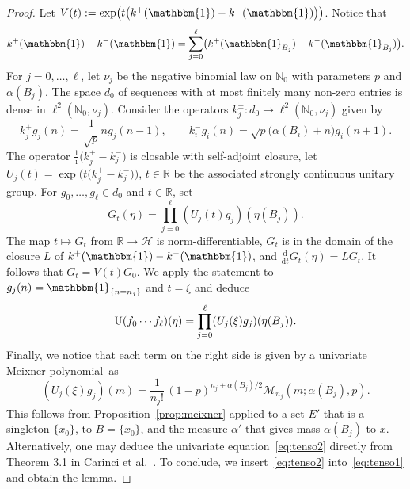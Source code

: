 \documentclass[pdftex]{sigma}
\numberwithin{equation}{section}
\newcommand{\N}{\mathbb{N}}
\newcommand{\R}{\mathbb{R}}
\newcommand{\dd}{\mathrm{d}} %
\newcommand{\1}{\mathbbm{1}}
\begin{document}
\begin{proof}
	Let $V(t):= \exp\bigl( t \bigl(k^+(\1) - k^-(\1)\bigr)\bigr)$. Notice that
	\[
		k^+(\1) - k^-(\1) = \sum_{j=0}^\ell \bigl( k^+(\1_{B_j}) - k^-(\1_{B_j})\bigr).
	\]
	For $j=0,\ldots,\ell$, let $\nu_j$ be the negative binomial law on $\N_0$ with parameters $p$ and $\alpha(B_j)$. The space $d_0$ of sequences with at most finitely many non-zero entries is dense in $\ell^2(\N_0,\nu_j)$. Consider the operators $k_j^\pm\colon d_0\to \ell^2(\N_0,\nu_j)$ given by
	\[
		k_j^+ g_j(n) = \frac{1}{\sqrt p} n g_{j}(n -1),\qquad k_i^- g_i(n) = \sqrt{p} \bigl(\alpha(B_{i})+n\bigr) g_i(n+1).
	\]
	The operator $\frac{ 1} {\mathrm i} \bigl(k_j^+- k_j^-\bigr)$ is closable with self-adjoint closure, let $U_j(t) = \exp\bigl( t \bigl(k_j^+-k_j^-\bigr)\bigr)$, $t\in \R$ be the associated strongly continuous unitary group.
	For $g_0,\ldots, g_\ell \in d_0$ and $t\in \R$, set
	\[
		G_t(\eta) = \prod_{j=0}^\ell ( U_j(t) g_j)( \eta(B_j)).
	\]
	The map $t\mapsto G_t$ from $\R\to \mathcal H$ is norm-differentiable, $G_t$ is in the domain of the closure $L$ of $k^+(\1)-k^-(\1)$, and $\frac{\dd}{\dd t} G_t(\eta) = L G_t$. It follows that $G_t = V(t) G_0$. We apply the statement to $g_j(n) = \1_{\{n=n_j\}}$ and $t=\xi$ and deduce
	\begin{equation} \label{eq:tenso1}
		{\rm U}(f_0\cdots f_\ell) (\eta) = \prod_{j=0}^\ell ( U_j(\xi) g_j)( \eta(B_j)).
	\end{equation}
	Finally, we notice that each term on the right side is given by a univariate Meixner polynomial~as%
	\begin{equation} \label{eq:tenso2}
		( U_j(\xi) g_j)(m) = \frac{1}{n_j!}\, (1-p)^{n_j+\alpha(B_j)/2} \mathcal M_{n_j}(m;\alpha(B_j),p).
	\end{equation}
	This follows from Proposition~\ref{prop:meixner} applied to a set $E'$ that is a singleton $\{x_0\}$, to $B= \{x_0\}$, and the measure $\alpha'$ that gives mass $\alpha(B_j)$ to $x$. Alternatively, one may deduce the univariate equation~\eqref{eq:tenso2} directly from Theorem 3.1 in Carinci et al.~\cite{carinci2019orthogonal}.
	To conclude, we insert~\eqref{eq:tenso2} into~\eqref{eq:tenso1} and obtain the lemma.
\end{proof}
\end{document}

